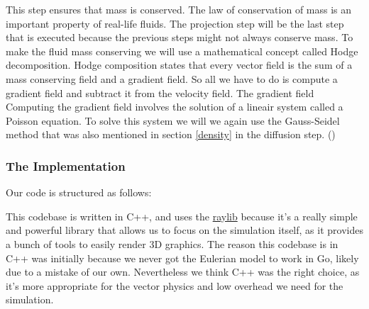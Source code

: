 \documentclass[a4paper,12pt]{article}
\begin{document}
This step ensures that mass is conserved. 
The law of conservation of mass is an important property of real-life fluids.
The projection step will be the last step that is executed because the previous steps might not always conserve mass.
To make the fluid mass conserving we will use a mathematical concept called Hodge decomposition.
Hodge composition states that every vector field is the sum of a mass conserving field and a gradient field.
So all we have to do is compute a gradient field and subtract it from the velocity field. 
The gradient field 
Computing the gradient field involves the solution of a lineair system called a Poisson equation.
To solve this system we will we again use the Gauss-Seidel method that was also mentioned in section \ref{density} in the diffusion step. (\cite{josstam})

\subsubsection{The Implementation}
Our code is structured as follows:

This codebase is written in C++, and uses the \hyperlink{https://www.raylib.com/}{raylib}
because it's a really simple and powerful library that allows us to focus on the
simulation itself, as it provides a bunch of tools to easily render 3D graphics.
The reason this codebase is in C++ was initially because we never got the Eulerian
model to work in Go, likely due to a mistake of our own. Nevertheless we think C++
was the right choice, as it's more appropriate for the vector physics and low overhead
we need for the simulation.
\end{document}
